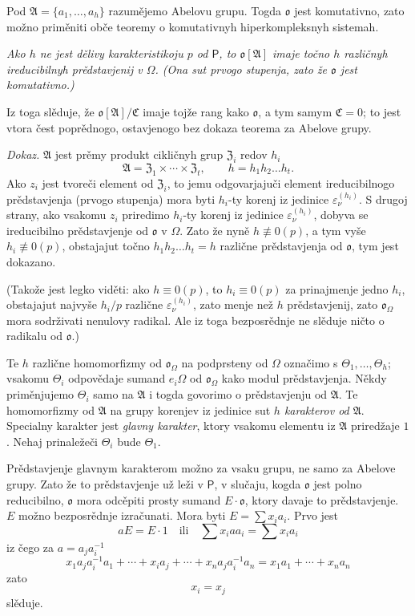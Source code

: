 \documentclass[11pt]{article}
\begin{document}
Pod \(\mathfrak A=\{a_1,\ldots,a_h\}\) razumějemo Abelovu grupu. Togda \(\mathfrak o\) jest komutativno, zato možno priměniti obče teoremy o komutativnyh hiperkompleksnyh sistemah.

\emph{Ako \(h\) ne jest dělivy karakteristikoju \(p\) od \(\mathsf P\), to \(\mathfrak o[\mathfrak A]\) imaje točno \(h\) različnyh ireducibilnyh prědstavjenij v \(\Omega\). (Ona sut prvogo stupenja, zato že \(\mathfrak o\) jest komutativno.)}

Iz toga slěduje, že \(\mathfrak o[\mathfrak A]/\mathfrak C\) imaje tojže rang kako \(\mathfrak o\), a tym samym \(\mathfrak C=0\); to jest vtora čest poprědnogo, ostavjenogo bez dokaza teorema za Abelove grupy.

\emph{Dokaz.} \(\mathfrak A\) jest prěmy produkt cikličnyh grup \(\mathfrak Z_i\) redov \(h_i\)
\[
\mathfrak A=\mathfrak Z_1\times\cdots\times\mathfrak Z_t,\qquad
h=h_1h_2\ldots h_t .
\]
Ako \(z_i\) jest tvoreči element od \(\mathfrak Z_i\), to jemu odgovarjajuči element ireducibilnogo prědstavjenja (prvogo stupenja) mora byti \(h_i\)-ty korenj iz jedinice \(\varepsilon_\nu^{(h_i)}\). S drugoj strany, ako vsakomu \(z_i\) priredimo \(h_i\)-ty korenj iz jedinice \(\varepsilon_\nu^{(h_i)}\), dobyva se ireducibilno prědstavjenje od \(\mathfrak o\) v \(\Omega\). Zato že nyně \(h\not\equiv0(p)\), a tym vyše \(h_i\not\equiv0(p)\), obstajajut točno \(h_1h_2\ldots h_t=h\) različne prědstavjenja od \(\mathfrak o\), tym jest dokazano.

(Takože jest legko viděti: ako \(h\equiv0(p)\), to \(h_i\equiv0(p)\) za prinajmenje jedno \(h_i\), obstajajut najvyše \(h_i/p\) različne \(\varepsilon_\nu^{(h_i)}\), zato menje než \(h\) prědstavjenij, zato \(\mathfrak o_\Omega\) mora sodrživati nenulovy radikal. Ale iz toga bezposrědnje ne slěduje ničto o radikalu od \(\mathfrak o\).)

Te \(h\) različne homomorfizmy od \(\mathfrak o_\Omega\) na podprsteny od \(\Omega\) označimo s \(\Theta_1,\ldots,\Theta_h\); vsakomu \(\Theta_i\) odpovědaje sumand \(e_i\Omega\) od \(\mathfrak o_\Omega\) kako modul prědstavjenja. Někdy priměnjujemo \(\Theta_i\) samo na \(\mathfrak A\) i togda govorimo o prědstavjenju od \(\mathfrak A\). Te homomorfizmy od \(\mathfrak A\) na grupy korenjev iz jedinice sut \emph{\(h\) karakterov od \(\mathfrak A\)}. Specialny karakter jest \emph{glavny karakter}, ktory vsakomu elementu iz \(\mathfrak A\) priredžaje \(1\). Nehaj prinaležeči \(\Theta_i\) bude \(\Theta_1\).

Prědstavjenje glavnym karakterom možno za vsaku grupu, ne samo za Abelove grupy. Zato že to prědstavjenje už leži v \(\mathsf P\), v slučaju, kogda \(\mathfrak o\) jest polno reducibilno, \(\mathfrak o\) mora odcěpiti prosty sumand \(E\cdot\mathfrak o\), ktory davaje to prědstavjenje. \(E\) možno bezposrědnje izračunati. Mora byti \(E=\sum x_i a_i\). Prvo jest
\[
aE=E\cdot 1\quad\text{ili}\quad \sum x_i a a_i=\sum x_i a_i
\]
iz čego za \(a=a_j a_i^{-1}\)
\[
x_1a_ja_i^{-1}a_1+\cdots+x_i a_j+\cdots+x_na_ja_i^{-1}a_n
=x_1a_1+\cdots+x_na_n
\]
zato
\[
x_i=x_j
\]
slěduje.
\end{document}
